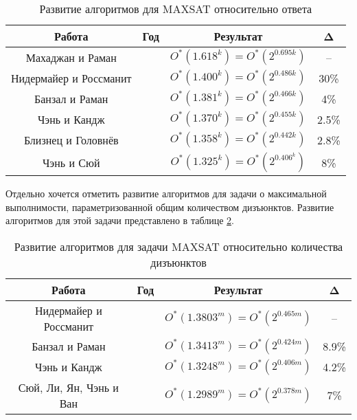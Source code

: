 \begin{table}[ht]
 \caption{Развитие алгоритмов для MAXSAT относительно ответа}
 \centering
 \begin{tabular}{|c|c|c|c|}
  \hline
  \textbf{Работа} & \textbf{Год} & \textbf{Результат} & \textbf{Δ} \\
  \hline
  Махаджан и Раман \cite{mahajan1999parameterizing} & \citeyear{mahajan1999parameterizing} & $O^*(1.618^k) = O^*(2^{0.695k})$ & -- \\
  Нидермайер и Россманит \cite{niedermeier1999new} & \citeyear{niedermeier1999new} & $O^*(1.400^k) = O^*(2^{0.486k})$ & 30\% \\
  Банзал и Раман \cite{bansal99} & \citeyear{bansal99} & $O^*(1.381^k) = O^*(2^{0.466k})$ & 4\% \\
  Чэнь и Кандж \cite{chen2004improved} & \citeyear{chen2004improved} & $O^*(1.370^k) = O^*(2^{0.455k})$ & 2.5\% \\
  Близнец и Головнёв \cite{bliznets12} & \citeyear{bliznets12} & $O^*(1.358^k) = O^*(2^{0.442k})$ & 2.8\% \\
  Чэнь и Сюй \cite{chen15} & \citeyear{chen15} & $O^*(1.325^k) = O^*(2^{0.406^k})$ & 8\% \\
  \hline
 \end{tabular}
 \label{table:maxsat-answer-research}
\end{table}

Отдельно хочется отметить развитие алгоритмов для задачи о максимальной выполнимости, параметризованной общим количеством дизъюнктов. Развитие алгоритмов для этой задачи представлено в таблице \ref{table:maxsat-clauses-research}.

\begin{table}[ht]
 \caption{Развитие алгоритмов для задачи MAXSAT относительно количества дизъюнктов}
 \centering
 \begin{tabular}{|c|c|c|c|}
  \hline
  \textbf{Работа} & \textbf{Год} & \textbf{Результат} & \textbf{Δ} \\
  \hline
  Нидермайер и Россманит \cite{niedermeier1999new} & \citeyear{niedermeier1999new} & $O^*(1.3803^m) = O^*(2^{0.465m})$ & -- \\
  Банзал и Раман \cite{bansal99} & \citeyear{bansal99} & $O^*(1.3413^m) = O^*(2^{0.424m})$ & 8.9\% \\
  Чэнь и Кандж \cite{chen2004improved} & \citeyear{chen2004improved} & $O^*(1.3248^m) = O^*(2^{0.406m})$ & 4.2\% \\
  Сюй, Ли, Ян, Чэнь и Ван \cite{xu19} & \citeyear{xu19} & $O^*(1.2989^m) = O^*(2^{0.378m})$ & 7\% \\
  \hline
 \end{tabular}
 \label{table:maxsat-clauses-research}
\end{table}

